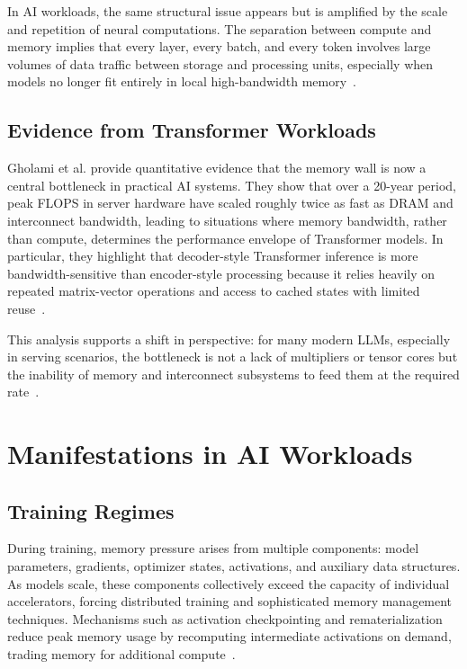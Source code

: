 \documentclass[conference]{IEEEtran}
\begin{document}
In AI workloads, the same structural issue appears but is amplified by the scale and repetition of neural computations. The separation between compute and memory implies that every layer, every batch, and every token involves large volumes of data traffic between storage and processing units, especially when models no longer fit entirely in local high-bandwidth memory~\cite{bavikadi2020review,roy2025breaking}.

\subsection{Evidence from Transformer Workloads}

Gholami et al. provide quantitative evidence that the memory wall is now a central bottleneck in practical AI systems. They show that over a 20-year period, peak FLOPS in server hardware have scaled roughly twice as fast as DRAM and interconnect bandwidth, leading to situations where memory bandwidth, rather than compute, determines the performance envelope of Transformer models. In particular, they highlight that decoder-style Transformer inference is more bandwidth-sensitive than encoder-style processing because it relies heavily on repeated matrix-vector operations and access to cached states with limited reuse~\cite{gholami2024ai}.

This analysis supports a shift in perspective: for many modern LLMs, especially in serving scenarios, the bottleneck is not a lack of multipliers or tensor cores but the inability of memory and interconnect subsystems to feed them at the required rate~\cite{gholami2024ai}.

\section{Manifestations in AI Workloads}
\label{sec:manifestations}

\subsection{Training Regimes}

During training, memory pressure arises from multiple components: model parameters, gradients, optimizer states, activations, and auxiliary data structures. As models scale, these components collectively exceed the capacity of individual accelerators, forcing distributed training and sophisticated memory management techniques. Mechanisms such as activation checkpointing and rematerialization reduce peak memory usage by recomputing intermediate activations on demand, trading memory for additional compute~\cite{gholami2024ai}.
\end{document}
